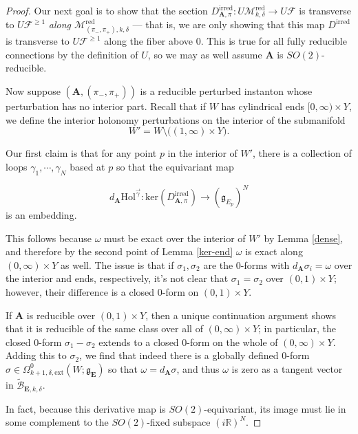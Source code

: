 \documentclass{memo-l}
\theoremstyle{definition}
\theoremstyle{remark}
\numberwithin{section}{chapter}
\numberwithin{equation}{chapter}
\begin{document}
\begin{proof}
Our next goal is to show that the section $D^{\text{irred}}_{\mathbf{A},\pi}: U\mathcal M^{\text{red}}_{k,\delta} \to U\mathcal F$ is transverse to $U\mathcal F^{\geq 1}$ \emph{along $\mathcal M^{\text{red}}_{(\pi_-,\pi_+), k, \delta}$} --- that is, we are only showing that this map $D^{\text{irred}}$ is transverse to $U\mathcal F^{\geq 1}$ along the fiber above $0$. This is true for all fully reducible connections by the definition of $U$, so we may as well assume $\mathbf{A}$ is $SO(2)$-reducible.

Now suppose $(\mathbf{A},(\pi_-, \pi_+))$ is a reducible perturbed instanton whose perturbation has no interior part. Recall that if $W$ has cylindrical ends $[0,\infty) \times Y$, we define the interior holonomy perturbations on the interior of the submanifold
$$W' = W \setminus \big((1,\infty) \times Y\big).$$

Our first claim is that for any point $p$ in the interior of $W'$, there is a collection of loops $\gamma_1, \cdots, \gamma_N$ based at $p$ so that the equivariant map

$$d_{\mathbf{A}}\text{Hol}^{\vec \gamma}: \text{ker}(D^{\text{irred}}_{\mathbf{A},\pi}) \to (\mathfrak g_{E_p})^N$$ is an embedding.

This follows because $\omega$ must be exact over the interior of $W'$ by Lemma \ref{dense}, and therefore by the second point of Lemma \ref{ker-end} $\omega$ is exact along $(0,\infty) \times Y$ as well. The issue is that if $\sigma_1, \sigma_2$ are the 0-forms with $d_{\mathbf{A}} \sigma_i = \omega$ over the interior and ends, respectively, it's not clear that $\sigma_1 = \sigma_2$ over $(0,1) \times Y$; however, their difference is a closed 0-form on $(0,1) \times Y$.

If $\mathbf{A}$ is reducible over $(0,1) \times Y$, then a unique continuation argument shows that it is reducible of the same class over all of $(0,\infty) \times Y$; in particular, the closed $0$-form $\sigma_1 - \sigma_2$ extends to a closed 0-form on the whole of $(0,\infty) \times Y$. Adding this to $\sigma_2$, we find that indeed there is a globally defined 0-form $\sigma \in \Omega^0_{k+1,\delta,\text{ext}}(W;\mathfrak g_{\mathbf{E}})$ so that $\omega = d_{\mathbf{A}} \sigma$, and thus $\omega$ is zero as a tangent vector in $\widetilde{\mathcal B}_{\mathbf{E},k,\delta}.$

In fact, because this derivative map is $SO(2)$-equivariant, its image must lie in some complement to the $SO(2)$-fixed subspace $(i\mathbb R)^N$.


\end{proof}
\end{document}
